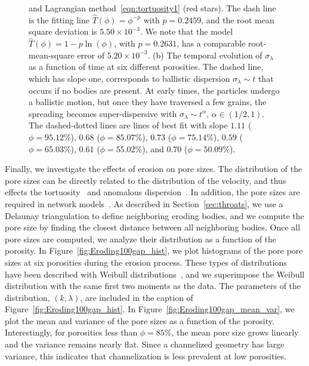 \documentclass[preprint,10pt]{elsarticle}
\begin{document}
\begin{figure}[H]
{and Lagrangian method~\eqref{eqn:tortuosity1} (red stars).  The dash
line is the fitting line $\widehat{T}(\phi)=\phi^{-p}$ with $p=0.2459$,
and the root mean square deviation is $5.50 \times 10^{-3}$.  We note
that the model $\widehat{T}(\phi) = 1 - p \ln (\phi)$, with $p=0.2631$,
has a comparable root-mean-square error of $5.20 \times 10^{-3}$.  (b)
The temporal evolution of $\sigma_\lambda$ as a function of time at six
different porosities.  The dashed line, which has slope one, corresponds
to ballistic dispersion $\sigma_\lambda \sim t$ that occurs if no bodies
are present.  At early times, the particles undergo a ballistic motion,
but once they have traversed a few grains, the spreading becomes
super-dispersive with $\sigma_\lambda \sim t^{\alpha}$, $\alpha \in
(1/2,1)$.  The dashed-dotted lines are lines of best fit with slope
$1.11$ ($\phi=95.12\%$), $0.68$ ($\phi=85.07\%$), $0.73$
($\phi=75.14\%$), $0.59$ ($\phi=65.03\%$), $0.61$ ($\phi=55.02\%$), and
$0.70$ ($\phi=50.09\%$).}
\end{figure}

Finally, we investigate the effects of erosion on pore sizes.  The
distribution of the pore sizes can be directly related to the
distribution of the velocity, and thus effects the
tortuosity~\cite{den-ica-hid2018} and anomalous
dispersion~\cite{dea-qua-bir-jua2018}. In addition, the pore sizes are
required in network models~\cite{bry-mel-cad1993, bry-kin-mel1993}.  As
described in Section~\ref{sec:throats}, we use a Delaunay triangulation
to define neighboring eroding bodies, and we compute the pore size by
finding the closest distance between all neighboring bodies.  Once all
pore sizes are computed, we analyze their distribution as a function of
the porosity.  In Figure~\ref{fig:Eroding100gap_hist}, we plot
histograms of the pore pore sizes at six porosities during the erosion
process. These types of distributions have been described with Weibull
distributions~\cite{ioa-cha1993}, and we superimpose the Weibull
distribution with the same first two moments as the data.  The
parameters of the distribution, $(k,\lambda)$, are included in the
caption of Figure~\ref{fig:Eroding100gap_hist}.  In
Figure~\ref{fig:Eroding100gap_mean_var}, we plot the mean and variance
of the pore sizes as a function of the porosity.  Interestingly, for
porosities less than $\phi = 85\%$, the mean pore size grows linearly
and the variance remains nearly flat. Since a channelized geometry has
large variance, this indicates that channelization is less prevalent at
low porosities.
\end{document}
